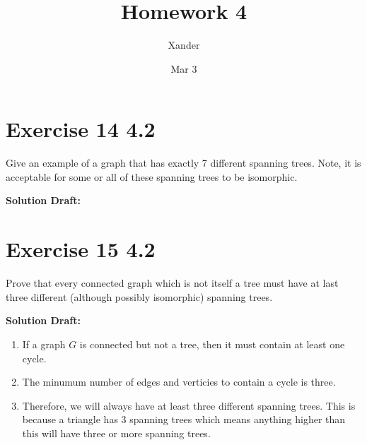 \documentclass{article}
\title{Homework 4}
\author{Xander}
\date{Mar 3}
\begin{document}
\maketitle

\section*{Exercise 14 4.2}  

Give an example of a graph that has exactly 7 different spanning trees. Note, it is acceptable for some or all of these spanning trees to be isomorphic.


\vspace{0.5cm}
\noindent\textbf{Solution Draft:} 
\vspace{0.2cm}

\section*{Exercise 15 4.2}  

Prove that every connected graph which is not itself a tree must have at last three different (although possibly isomorphic) spanning trees.


\vspace{0.5cm}
\noindent\textbf{Solution Draft:} 
\vspace{0.2cm}

\begin{enumerate}
    \item If a graph $G$ is connected but not a tree, then it must contain at least one cycle. 
    \item The minumum number of edges and verticies to contain a cycle is three.
    \item Therefore, we will always have at least three different spanning trees. This is because a triangle has 3 spanning trees which means anything higher than this will have three or more spanning trees.
\end{enumerate}
\end{document}
